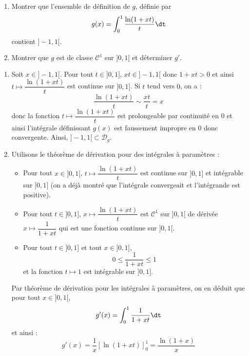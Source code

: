 \documentclass[a4paper,10pt]{report}
\begin{document}
\everymath{\displaystyle}


\begin{center}
\end{center}

\bigskip

\begin{Exercice}{} 
\begin{enumerate}
\item Montrer que l'ensemble de définition de $g$, définie par 
$$ g(x) = \int_{0}^1 \dfrac{\ln(1+xt)}{t} \dt$$
contient $]-1,1[$.
\item Montrer que $g$ est de classe $\mathcal{C}^1$ sur $]0,1[$ et déterminer $g'$.
\end{enumerate}
\end{Exercice}

\corr 
\begin{enumerate}
\item Soit $x \in ]-1,1[$. Pour tout $t \in ]0,1]$, $xt \in ]-1,1[$ donc $1+xt >0$ et ainsi $t \mapsto \dfrac{\ln(1+xt)}{t} $ est continue sur $]0,1]$. Si $t$ tend vers $0$, on a :
$$ \dfrac{\ln(1+xt)}{t}  \sim \dfrac{xt}{t}= x$$
donc la fonction $t \mapsto \dfrac{\ln(1+xt)}{t} $ est prolongeable par continuité en $0$ et ainsi l'intégrale définissant $g(x)$ est faussement impropre en $0$ donc convergente. Ainsi, $]-1,1[ \subset \mathcal{D}_g$.

\item Utilisons le théorème de dérivation pour des intégrales à paramètres :
\begin{itemize}
\item Pour tout $x \in ]0,1[$, $t \mapsto \dfrac{\ln(1+xt)}{t}$ est continue sur $]0,1]$ et intégrable sur $]0,1]$ (on a déjà montré que l'intégrale convergeait et l'intégrande est positive).
\item Pour tout $t \in ]0,1]$, $x \mapsto \dfrac{\ln(1+xt)}{t}$ est $\mathcal{C}^1$ sur $]0,1[$ de dérivée $x \mapsto \dfrac{1}{1+xt}$ qui est une fonction continue sur $]0,1[$.
\item Pour tout $t \in ]0,1]$ et tout $x \in ]0,1]$,
$$ 0 \leq \dfrac{1}{1+xt} \leq 1$$
et la fonction $t \mapsto 1$ est intégrable sur $]0,1]$.
\end{itemize}
Par théorème de dérivation pour les intégrales à paramètres, on en déduit que pour tout $x \in ]0,1[$,
$$ g'(x) = \int_{0}^1 \dfrac{1}{1+xt} \dt$$
et ainsi :
$$ g'(x) = \dfrac{1}{x} [ \ln(1+xt) ]_0^1 = \dfrac{\ln(1+x)}{x}$$
\end{enumerate}
\end{document}
